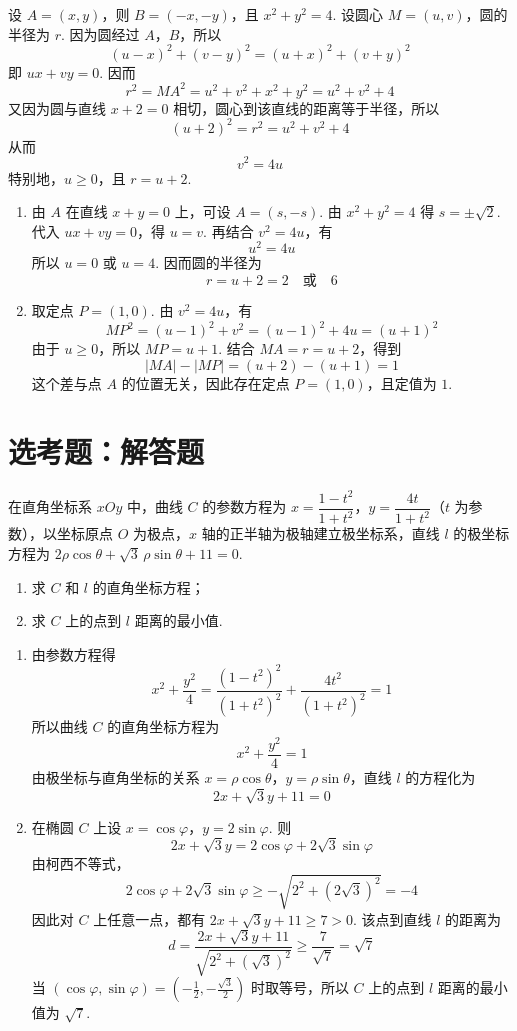 \begin{solution}
设 \(A=(x,y)\)，则 \(B=(-x,-y)\)，且 \(x^2+y^2=4\). 设圆心 \(M=(u,v)\)，圆的半径为 \(r\). 因为圆经过 \(A\)，\(B\)，所以
\[
(u-x)^2+(v-y)^2=(u+x)^2+(v+y)^2
\]
即 \(ux+vy=0\). 因而
\[
r^2=MA^2=u^2+v^2+x^2+y^2=u^2+v^2+4
\]
又因为圆与直线 \(x+2=0\) 相切，圆心到该直线的距离等于半径，所以
\[
(u+2)^2=r^2=u^2+v^2+4
\]
从而
\[
v^2=4u
\]
特别地，\(u\ge0\)，且 \(r=u+2\).

\begin{enumerate}
\item 由 \(A\) 在直线 \(x+y=0\) 上，可设 \(A=(s,-s)\). 由 \(x^2+y^2=4\) 得 \(s=\pm\sqrt2\). 代入 \(ux+vy=0\)，得 \(u=v\). 再结合 \(v^2=4u\)，有
\[
u^2=4u
\]
所以 \(u=0\) 或 \(u=4\). 因而圆的半径为
\[
r=u+2=2\quad\text{或}\quad6
\]

\item 取定点 \(P=(1,0)\). 由 \(v^2=4u\)，有
\[
MP^2=(u-1)^2+v^2=(u-1)^2+4u=(u+1)^2
\]
由于 \(u\ge0\)，所以 \(MP=u+1\). 结合 \(MA=r=u+2\)，得到
\[
|MA|-|MP|=(u+2)-(u+1)=1
\]
这个差与点 \(A\) 的位置无关，因此存在定点 \(P=(1,0)\)，且定值为 \(1\).
\end{enumerate}
\end{solution}

\section{选考题：解答题}

\begin{problem}
在直角坐标系 \( xOy \) 中，曲线 \(C\) 的参数方程为 \( x=\dfrac{1-t^2}{1+t^2} \)，\( y=\dfrac{4t}{1+t^2} \)（\( t \) 为参数），以坐标原点 \(O\) 为极点，\( x \) 轴的正半轴为极轴建立极坐标系，直线 \( l \) 的极坐标方程为 \( 2\rho \cos \theta+\sqrt3\,\rho \sin \theta+11=0 \).

\begin{enumerate}
\item 求 \(C\) 和 \( l \) 的直角坐标方程；
\item 求 \(C\) 上的点到 \( l \) 距离的最小值.
\end{enumerate}
\end{problem}

\begin{solution}
\begin{enumerate}
\item 由参数方程得
\[
x^2+\frac{y^2}{4}=\frac{(1-t^2)^2}{(1+t^2)^2}+\frac{4t^2}{(1+t^2)^2}=1
\]
所以曲线 \(C\) 的直角坐标方程为
\[
x^2+\frac{y^2}{4}=1
\]
由极坐标与直角坐标的关系 \(x=\rho\cos\theta\)，\(y=\rho\sin\theta\)，直线 \(l\) 的方程化为
\[
2x+\sqrt3y+11=0
\]

\item 在椭圆 \(C\) 上设 \(x=\cos\varphi\)，\(y=2\sin\varphi\). 则
\[
2x+\sqrt3y=2\cos\varphi+2\sqrt3\sin\varphi
\]
由柯西不等式，
\[
2\cos\varphi+2\sqrt3\sin\varphi\ge-\sqrt{2^2+(2\sqrt3)^2}=-4
\]
因此对 \(C\) 上任意一点，都有 \(2x+\sqrt3y+11\ge7>0\). 该点到直线 \(l\) 的距离为
\[
d=\frac{2x+\sqrt3y+11}{\sqrt{2^2+(\sqrt3)^2}}\ge\frac7{\sqrt7}=\sqrt7
\]
当 \((\cos\varphi,\sin\varphi)=\left(-\frac12,-\frac{\sqrt3}{2}\right)\) 时取等号，所以 \(C\) 上的点到 \(l\) 距离的最小值为 \(\sqrt7\).
\end{enumerate}
\end{solution}

